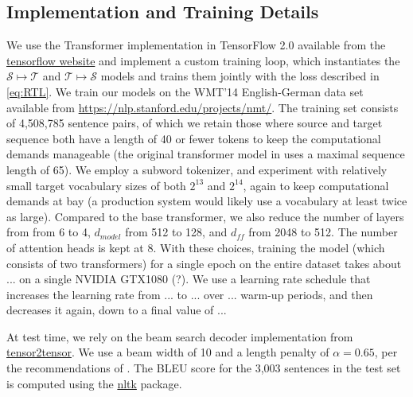 \documentclass[11pt,a4paper]{article}
\begin{document}
\subsection{Implementation and Training Details}
We use the Transformer implementation in TensorFlow 2.0 available from the \href{https://www.tensorflow.org/tutorials/text/transformer}{tensorflow website} and implement a custom training loop, which instantiates the $\mathcal{S}\mapsto\mathcal{T}$ and $\mathcal{T}\mapsto\mathcal{S}$ models and trains them jointly with the loss described in \eqref{eq:RTL}. We train our models on the WMT'14 English-German data set available from \href{https://nlp.stanford.edu/projects/nmt/}{https://nlp.stanford.edu/projects/nmt/}. The training set consists of 4,508,785 sentence pairs, of which we retain those where source and target sequence both have a length of 40 or fewer tokens to keep the computational demands manageable (the original transformer model in \citet{transformer} uses a maximal sequence length of 65). We employ a subword tokenizer, and experiment with relatively small target vocabulary sizes of both $2^{13}$ and $2^{14}$, again to keep computational demands at bay (a production system would likely use a vocabulary at least twice as large). Compared to the base transformer, we also reduce the number of layers from from 6 to 4, $d_{model}$ from 512 to 128, and $d_{ff}$ from 2048 to 512. The number of attention heads is kept at 8.
With these choices, training the model (which consists of two transformers) for a single epoch on the entire dataset takes about ... on a single NVIDIA GTX1080 (?). We use a learning rate schedule that increases the learning rate from ... to ... over ... warm-up periods, and then decreases it again, down to a final value of ... 

At test time, we rely on the beam search decoder implementation from \href{https://github.com/tensorflow/tensor2tensor/blob/master/tensor2tensor/utils}{tensor2tensor}. We use a beam width of 10 and a length penalty of $\alpha=0.65$, per the recommendations of \citet{googlenmt}. The BLEU score for the 3,003 sentences in the test set is computed using the \href{https://www.nltk.org/}{nltk} package. 
\end{document}
